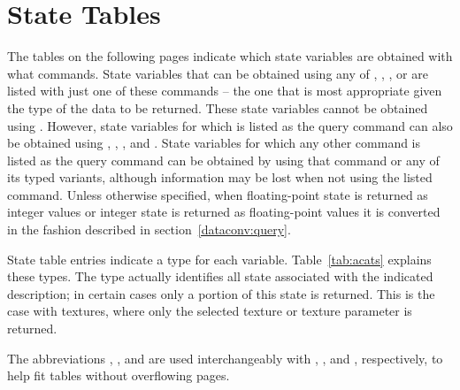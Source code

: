 
\chapter{State Tables}                                              %
\label{state:tables}

The tables on the following pages indicate which state variables are
obtained with what commands. State variables that can be obtained using any
of , , , or
 are listed with just one of these commands -- the one that
is most appropriate given the type of the data to be returned. These state
variables cannot be obtained using . However, state variables
for which  is listed as the query command can also be
obtained using , , ,
and . State variables for which any other command is listed
as the query command can be obtained by using that command or any of its
typed variants, although information may be lost when not using the listed
command. Unless otherwise specified, when floating-point state is returned
as integer values or integer state is returned as floating-point values it
is converted in the fashion described in section~\ref{dataconv:query}.

State table entries indicate a type for each variable. Table~\ref{tab:acats}
explains these types. The type actually identifies all state associated with
the indicated description; in certain cases only a portion of this state is
returned. This is the case with textures, where only the selected texture or
texture parameter is returned.

The abbreviations , , and  are used
interchangeably with , , and ,
respectively, to help fit tables without overflowing pages.

